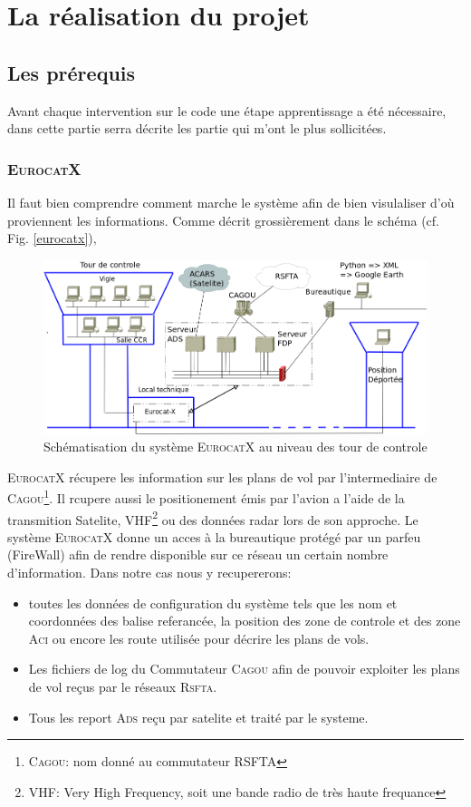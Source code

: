 \section{La réalisation du projet}
    \subsection{Les prérequis}
Avant chaque intervention sur le code une étape apprentissage a été nécessaire, dans cette partie serra décrite les partie qui m'ont le plus sollicitées.

        \subsubsection{\textsc{EurocatX}}
Il faut bien comprendre comment marche le système afin de bien visulaliser d'où proviennent les informations. Comme décrit grossièrement dans le schéma (cf. Fig. \vref{eurocatx}),
\begin{figure}
\center
\includegraphics[width=15cm]{images/SchemaControle.png}
\caption{Schématisation du système \textsc{EurocatX} au niveau des tour de controle}
\label{eurocatx}
\end{figure}
\textsc{EurocatX} récupere les information sur les plans de vol par l'intermediaire de \textsc{Cagou}\footnote{\textsc{Cagou}: nom donné au commutateur RSFTA}. Il rcupere aussi le positionement émis par l'avion a l'aide de la transmition Satelite, VHF\footnote{VHF: Very High Frequency, soit une bande radio de très haute frequance} ou des données radar lors de son approche. Le système \textsc{EurocatX} donne un acces à la bureautique protégé par un parfeu (FireWall) afin de rendre disponible sur ce réseau un certain nombre d'information. Dans notre cas nous y recupererons:
\begin{itemize}
\item toutes les données de configuration du système tels que les nom et coordonnées des balise referancée, la position des zone de controle et des zone \textsc{Aci} ou encore les route utilisée pour décrire les plans de vols.
\item Les fichiers de log du Commutateur \textsc{Cagou} afin de pouvoir exploiter les plans de vol reçus par le réseaux \textsc{Rsfta}.
\item Tous les report \textsc{Ads} reçu par satelite et traité par le systeme.
\end{itemize} 
